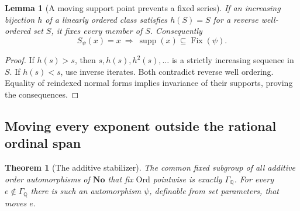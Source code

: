 \documentclass[11pt,a4paper]{article}
\numberwithin{equation}{section}
\newtheorem{theorem}{Theorem}[section]
\newtheorem{lemma}[lemma]{Lemma}
\theoremstyle{definition}
\theoremstyle{remark}
\newcommand{\No}{\mathbf{No}}
\newcommand{\Ord}{\mathrm{Ord}}
\newcommand{\Q}{\mathbb Q}
\newcommand{\supp}{\operatorname{supp}}
\begin{document}
\begin{lemma}[A moving support point prevents a fixed series]
\label{dsn:rp:lem:orbit}
If an increasing bijection \(h\) of a linearly ordered class satisfies
\(h(S)=S\) for a reverse well-ordered set \(S\), it fixes every member
of \(S\). Consequently
\[
 S_\psi(x)=x\ \Longrightarrow\
 \supp(x)\subseteq\operatorname{Fix}(\psi).
\]
\end{lemma}

\begin{proof}
If \(h(s)>s\), then \(s,h(s),h^2(s),\ldots\) is a strictly increasing
sequence in \(S\). If \(h(s)<s\), use inverse iterates. Both contradict
reverse well ordering. Equality of reindexed normal forms implies
invariance of their supports, proving the consequences.
\end{proof}

\subsection{Moving every exponent outside the rational ordinal span}

\begin{theorem}[The additive stabilizer]\label{dsn:rp:thm:additive-stabilizer}
The common fixed subgroup of all additive order automorphisms of \(\No\)
that fix \(\Ord\) pointwise is exactly \(\Gamma_{\Q}\). For every \(e\notin \Gamma_{\Q}\)
there is such an automorphism \(\psi\), definable from set parameters,
that moves \(e\).
\end{theorem}
\end{document}
